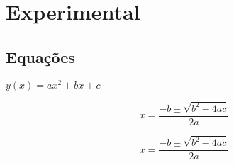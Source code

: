 \chapter{Experimental}

\section{Equações}

$y(x) = ax^2 + bx + c$

$$
	x = \frac{-b \pm \sqrt{b^2 -4ac}}{2a}
$$

\begin{equation}
	x = \frac{-b \pm \sqrt{b^2 -4ac}}{2a}
\end{equation}



